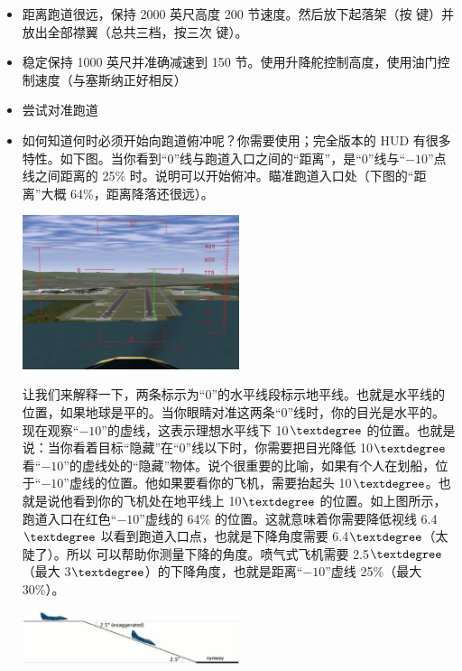 \begin{itemize}
    \item 距离跑道很远，保持 2000 英尺高度 200 节速度。然后放下起落架（按  键）并放出全部襟翼（总共三档，按三次 \key{]} 键）。
    \item 稳定保持 1000 英尺并准确减速到 150 节。使用升降舵控制高度，使用油门控制速度（与塞斯纳正好相反）
    \item 尝试对准跑道
    \item 如何知道何时必须开始向跑道俯冲呢？你需要使用；完全版本的 HUD 有很多特性。如下图。当你看到“0”线与跑道入口之间的“距离”，是“0”线与“$-10$”点线之间距离的 25\% 时。说明可以开始俯冲。瞄准跑道入口处（下图的“距离”大概 64\%，距离降落还很远）。
    
\begin{center}
\includegraphics[width=0.5\textwidth]{img/tut_54}
\end{center}

让我们来解释一下，两条标示为“0”的水平线段标示地平线。也就是水平线的位置，如果地球是平的。当你眼睛对准这两条“0”线时，你的目光是水平的。现在观察“$-10$”的虚线，这表示理想水平线下 10$\textdegree$ 的位置。也就是说：当你看着目标“隐藏”在“0”线以下时，你需要把目光降低 10$\textdegree$ 看“$-10$”的虚线处的“隐藏”物体。说个很重要的比喻，如果有个人在划船，位于“$-10$”虚线的位置。他如果要看你的飞机，需要抬起头 10$\textdegree$。也就是说他看到你的飞机处在地平线上 10$\textdegree$ 的位置。如上图所示，跑道入口在红色“$-10$”虚线的 64\% 的位置。这就意味着你需要降低视线 6.4$\textdegree$ 以看到跑道入口点，也就是下降角度需要 6.4$\textdegree$（太陡了）。所以  可以帮助你测量下降的角度。喷气式飞机需要 2.5$\textdegree$（最大 3$\textdegree$）的下降角度，也就是距离“$-10$”虚线 25\%（最大 30\%）。

\begin{center}
\includegraphics[width=0.5\textwidth]{img/tut_55}
\end{center}


\end{itemize}
